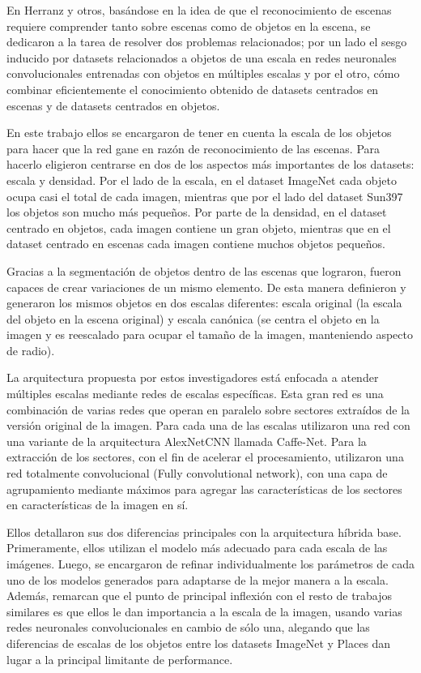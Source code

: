 En \cite{scene_recognition_cnn} Herranz y otros, basándose en la idea de que el reconocimiento de escenas requiere comprender tanto sobre escenas como de objetos en la escena, se dedicaron a la tarea de resolver dos problemas relacionados; por un lado el sesgo inducido por datasets relacionados a objetos de una escala en redes neuronales convolucionales entrenadas con objetos en múltiples escalas y por el otro, cómo combinar eficientemente el conocimiento obtenido de datasets centrados en escenas y de datasets centrados en objetos.

En este trabajo ellos se encargaron de tener en cuenta la escala de los objetos para hacer que la red gane en razón de reconocimiento de las escenas. Para hacerlo eligieron centrarse en dos de los aspectos más importantes de los datasets: escala y densidad. Por el lado de la escala, en el dataset ImageNet cada objeto ocupa casi el total de cada imagen, mientras que por el lado del dataset Sun397 los objetos son mucho más pequeños. Por parte de la densidad, en el dataset centrado en objetos, cada imagen contiene un gran objeto, mientras que en el dataset centrado en escenas cada imagen contiene muchos objetos pequeños.

Gracias a la segmentación de objetos dentro de las escenas que lograron, fueron capaces de crear variaciones de un mismo elemento. De esta manera definieron y generaron los mismos objetos en dos escalas diferentes: escala original (la escala del objeto en la escena original) y escala canónica (se centra el objeto en la imagen y es reescalado para ocupar el tamaño de la imagen, manteniendo aspecto de radio).

La arquitectura propuesta por estos investigadores está enfocada a atender múltiples escalas mediante redes de escalas específicas. Esta gran red es una combinación de varias redes que operan en paralelo sobre sectores extraídos de la versión original de la imagen. Para cada una de las escalas utilizaron una red con una variante de la arquitectura AlexNetCNN llamada Caffe-Net. Para la extracción de los sectores, con el fin de acelerar el procesamiento, utilizaron una red totalmente convolucional (Fully convolutional network), con una capa de agrupamiento mediante máximos para agregar las características de los sectores en características de la imagen en sí.

Ellos detallaron sus dos diferencias principales con la arquitectura híbrida base. Primeramente, ellos utilizan el modelo más adecuado para cada escala de las imágenes. Luego, se encargaron de refinar individualmente los parámetros de cada uno de los modelos generados para adaptarse de la mejor manera a la escala. Además, remarcan que el punto de principal inflexión con el resto de trabajos similares es que ellos le dan importancia a la escala de la imagen, usando varias redes neuronales convolucionales en cambio de sólo una, alegando que las diferencias de escalas de los objetos entre los datasets ImageNet y Places dan lugar a la principal limitante de performance.

